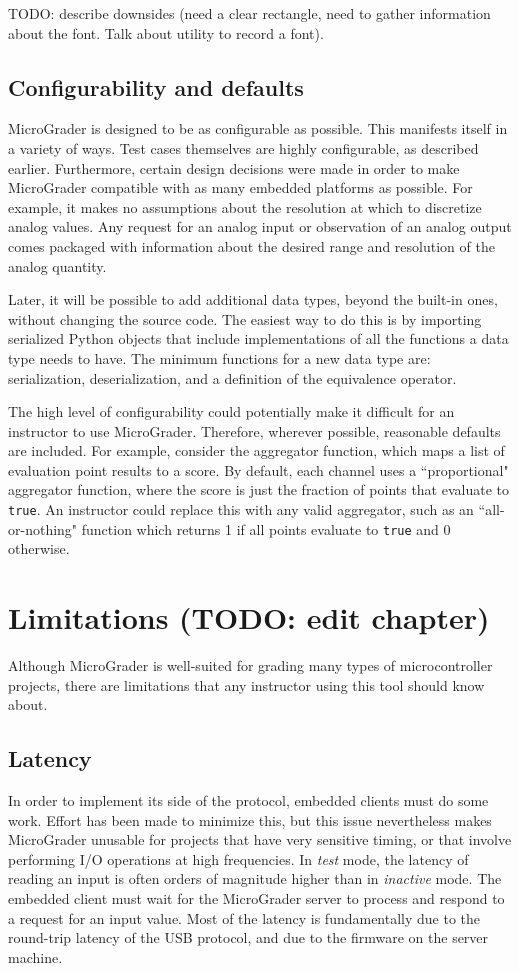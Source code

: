 \documentclass[12pt]{article}
\begin{document}
TODO: describe downsides (need a clear rectangle, need to gather information about the font.  Talk about utility to record a font).

\subsection{Configurability and defaults}
\label{sec:config}
MicroGrader is designed to be as configurable as possible.  This manifests itself in a variety of ways.  Test cases themselves are highly configurable, as described earlier.  Furthermore, certain design decisions were made in order to make MicroGrader compatible with as many embedded platforms as possible.  For example, it makes no assumptions about the resolution at which to discretize analog values.  Any request for an analog input or observation of an analog output comes packaged with information about the desired range and resolution of the analog quantity.

Later, it will be possible to add additional data types, beyond the built-in ones, without changing the source code.  The easiest way to do this is by importing serialized \cite{pickle} Python objects that include implementations of all the functions a data type needs to have.  The minimum functions for a new data type are: serialization, deserialization, and a definition of the equivalence operator.

The high level of configurability could potentially make it difficult for an instructor to use MicroGrader.  Therefore, wherever possible, reasonable defaults are included.  For example, consider the aggregator function, which maps a list of evaluation point results to a score.  By default, each channel uses a ``proportional" aggregator function, where the score is just the fraction of points that evaluate to \texttt{true}.  An instructor could replace this with any valid aggregator, such as an ``all-or-nothing" function which returns 1 if all points evaluate to \texttt{true} and 0 otherwise.


\newpage
\section{Limitations (TODO: edit chapter)}
Although MicroGrader is well-suited for grading many types of microcontroller projects, there are limitations that any instructor using this tool should know about.

\subsection{Latency}
In order to implement its side of the protocol, embedded clients must do some work.  Effort has been made to minimize this, but this issue nevertheless makes MicroGrader unusable for projects that have very sensitive timing, or that involve performing I/O operations at high frequencies.  In \textit{test} mode, the latency of reading an input is often orders of magnitude higher than in \textit{inactive} mode.  The embedded client must wait for the MicroGrader server to process and respond to a request for an input value.  Most of the latency is fundamentally due to the round-trip latency of the USB protocol, and due to the firmware on the server machine.
\end{document}
